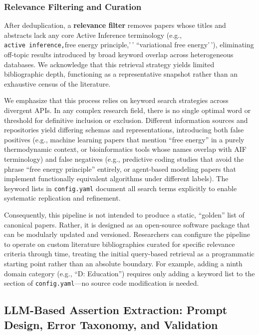 \documentclass[
  english,
]{article}
\begin{document}
\subsubsection{Relevance Filtering and
Curation}\label{relevance-filtering-and-curation}

After deduplication, a \textbf{relevance filter} removes papers whose
titles and abstracts lack any core Active Inference terminology (e.g.,
\texttt{active\ inference,\textquotesingle{}\textquotesingle{}}free
energy principle,'\,' ``variational free energy'\,'), eliminating
off-topic results introduced by broad keyword overlap across
heterogeneous databases. We acknowledge that this retrieval strategy
yields limited bibliographic depth, functioning as a representative
snapshot rather than an exhaustive census of the literature.

We emphasize that this process relies on keyword search strategies
across divergent APIs. In any complex research field, there is no single
optimal word or threshold for definitive inclusion or exclusion.
Different information sources and repositories yield differing schemas
and representations, introducing both false positives (e.g., machine
learning papers that mention ``free energy'' in a purely thermodynamic
context, or bioinformatics tools whose names overlap with AIF
terminology) and false negatives (e.g., predictive coding studies that
avoid the phrase ``free energy principle'' entirely, or agent-based
modeling papers that implement functionally equivalent algorithms under
different labels). The keyword lists in \texttt{config.yaml} document
all search terms explicitly to enable systematic replication and
refinement.

Consequently, this pipeline is not intended to produce a static,
``golden'' list of canonical papers. Rather, it is designed as an
open-source software package that can be modularly updated and
versioned. Researchers can configure the pipeline to operate on custom
literature bibliographies curated for specific relevance criteria
through time, treating the initial query-based retrieval as a
programmatic starting point rather than an absolute boundary. For
example, adding a ninth domain category (e.g., ``D: Education'')
requires only adding a keyword list to the 
section of \texttt{config.yaml}---no source code modification is needed.

\newpage

\subsection{LLM-Based Assertion Extraction: Prompt Design, Error
Taxonomy, and Validation}\label{sec:extraction_pipeline}
\end{document}
